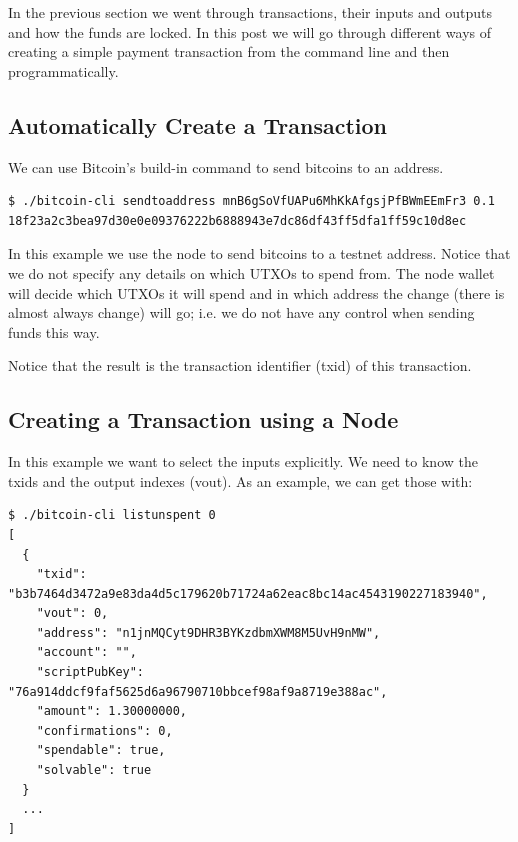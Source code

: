In the previous section we went through transactions, their inputs and outputs and how the funds are locked. In this post we will go through different ways of creating a simple payment transaction from the command line and then programmatically. 

\subsection*{Automatically Create a Transaction}

We can use Bitcoin's build-in command  to send bitcoins to an address.

\begin{emphbox}
\begin{lstlisting}[style=Bash]
$ ./bitcoin-cli sendtoaddress mnB6gSoVfUAPu6MhKkAfgsjPfBWmEEmFr3 0.1
18f23a2c3bea97d30e0e09376222b6888943e7dc86df43ff5dfa1ff59c10d8ec
\end{lstlisting}
\end{emphbox}

In this example we use the node to send  bitcoins to a testnet address. Notice that we do not specify any details on which UTXOs to spend from. The node wallet will decide which UTXOs it will spend and in which address the change (there is almost always change) will go; i.e. we do not have any control when sending funds this way.

\begin{note}
Notice that the result is the transaction identifier (txid) of this transaction.
\end{note}


\subsection*{Creating a Transaction using a Node}

In this example we want to select the inputs explicitly. We need to know the txids and the output indexes (vout). As an example, we can get those with:

\begin{emphbox}
\begin{lstlisting}[style=Bash]
$ ./bitcoin-cli listunspent 0
[
  {
    "txid": "b3b7464d3472a9e83da4d5c179620b71724a62eac8bc14ac4543190227183940",
    "vout": 0,
    "address": "n1jnMQCyt9DHR3BYKzdbmXWM8M5UvH9nMW",
    "account": "",
    "scriptPubKey": "76a914ddcf9faf5625d6a96790710bbcef98af9a8719e388ac",
    "amount": 1.30000000,
    "confirmations": 0,
    "spendable": true,
    "solvable": true
  }
  ...
]
\end{lstlisting}
\end{emphbox}

